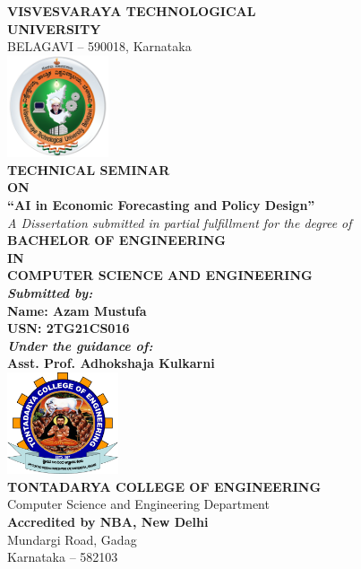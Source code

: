 \begin{titlepage}
    \centering

    {\LARGE \bfseries VISVESVARAYA TECHNOLOGICAL}\\[0.2cm]
    {\LARGE \bfseries UNIVERSITY}\\[0.2cm]
    {\large BELAGAVI – 590018, Karnataka}\\[1cm]

    \includegraphics[height=3cm]{../images/vtu.png}\\[1cm]

    {\Large \bfseries TECHNICAL SEMINAR}\\[0.3cm]
    {\large \bfseries ON}\\[0.3cm]

    {\LARGE \bfseries ``AI in Economic Forecasting and}
    {\LARGE \bfseries Policy Design''}\\[0.3cm]

    {\itshape A Dissertation submitted in partial fulfillment for the degree of}\\[0.2cm]

    {\large \bfseries BACHELOR OF ENGINEERING}\\
    {\large \bfseries IN}\\
    {\large \bfseries COMPUTER SCIENCE AND ENGINEERING}\\[1cm]

    \textbf{\textit{Submitted by:}}\\[0.2cm]
    \textbf{Name: Azam Mustufa}\\
    \textbf{USN: 2TG21CS016}\\[0.8cm]

    \textbf{\textit{Under the guidance of:}}\\[0.2cm]
    \textbf{Asst. Prof. Adhokshaja Kulkarni} \\ [0.5cm]

    \includegraphics[height=3cm]{../images/tce.png}\\[1cm]

    {\bfseries TONTADARYA COLLEGE OF ENGINEERING}\\
    Computer Science and Engineering Department\\[0.3cm]

    \textbf{Accredited by NBA, New Delhi}\\
    Mundargi Road, Gadag \\
    Karnataka – 582103

\end{titlepage}